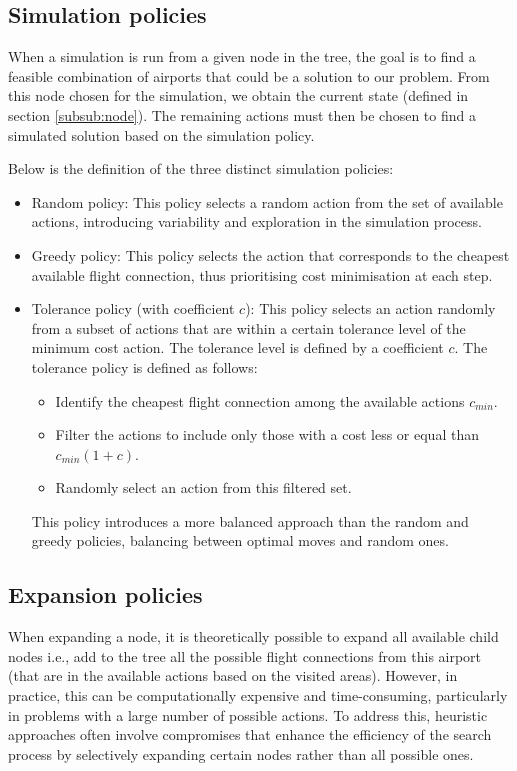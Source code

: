 \documentclass[conference]{IEEEtran}
\begin{document}
\subsection{Simulation policies}
\label{sub:simulation_policies}
When a simulation is run from a given node in the tree, the goal is to find a feasible combination of airports that could be a solution to our problem.
From this node chosen for the simulation, we obtain the current state (defined in section \ref{subsub:node}). The remaining actions must then be chosen to find a simulated solution based on the simulation policy.

Below is the definition of the three distinct simulation policies:

\begin{itemize}
    \item Random policy: This policy selects a random action from the set of available actions, introducing variability and exploration in the simulation process.
    \item Greedy policy: This policy selects the action that corresponds to the cheapest available flight connection, thus prioritising cost minimisation at each step.

    \item Tolerance policy (with coefficient $c$):
          This policy selects an action randomly from a subset of actions that are within a certain tolerance level of the minimum cost action. The tolerance level is defined by a coefficient $c$. The tolerance policy is defined as follows:
          \begin{itemize}
              \item Identify the cheapest flight connection among the available actions $c_{min}$.
              \item Filter the actions to include only those with a cost less or equal than $c_{min}(1+c) $.
              \item Randomly select an action from this filtered set.
          \end{itemize}
          This policy introduces a more balanced approach than the random and greedy policies, balancing between optimal moves and random ones.
\end{itemize}



\subsection{Expansion policies}
\label{sub:expansion_policies}
When expanding a node, it is theoretically possible to expand all available child nodes i.e., add to the tree all the possible flight connections from this airport (that are in the available actions based on the visited areas). However, in practice, this can be computationally expensive and time-consuming, particularly in problems with a large number of possible actions. To address this, heuristic approaches often involve compromises that enhance the efficiency of the search process by selectively expanding certain nodes rather than all possible ones.
\end{document}

